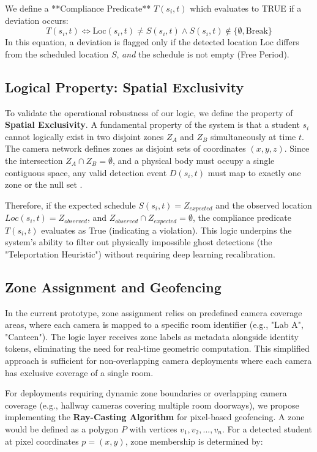 \documentclass[conference]{IEEEtran}
\begin{document}
We define a **Compliance Predicate** $T(s_i, t)$ which evaluates to TRUE if a deviation occurs:
\begin{equation}
T(s_i, t) \iff \text{Loc}(s_i, t) \neq S(s_i, t) \land S(s_i, t) \notin \{\emptyset, \text{Break}\}
\end{equation}
In this equation, a deviation is flagged only if the detected location $\text{Loc}$ differs from the scheduled location $S$, \textit{and} the schedule is not empty (Free Period).

\subsection{Logical Property: Spatial Exclusivity}
To validate the operational robustness of our logic, we define the property of \textbf{Spatial Exclusivity}. 
A fundamental property of the system is that a student $s_i$ cannot logically exist in two disjoint zones $Z_A$ and $Z_B$ simultaneously at time $t$. The camera network defines zones as disjoint sets of coordinates $(x,y,z)$. Since the intersection $Z_A \cap Z_B = \emptyset$, and a physical body must occupy a single contiguous space, any valid detection event $D(s_i, t)$ must map to exactly one zone or the null set \cite{b13}.

Therefore, if the expected schedule $S(s_i, t) = Z_{expected}$ and the observed location $Loc(s_i, t) = Z_{observed}$, and $Z_{observed} \cap Z_{expected} = \emptyset$, the compliance predicate $T(s_i, t)$ evaluates as True (indicating a violation). This logic underpins the system's ability to filter out physically impossible ghost detections (the "Teleportation Heuristic") without requiring deep learning recalibration.

\subsection{Zone Assignment and Geofencing}
In the current prototype, zone assignment relies on predefined camera coverage areas, where each camera is mapped to a specific room identifier (e.g., "Lab A", "Canteen"). The logic layer receives zone labels as metadata alongside identity tokens, eliminating the need for real-time geometric computation. This simplified approach is sufficient for non-overlapping camera deployments where each camera has exclusive coverage of a single room.

For deployments requiring dynamic zone boundaries or overlapping camera coverage (e.g., hallway cameras covering multiple room doorways), we propose implementing the \textbf{Ray-Casting Algorithm} for pixel-based geofencing. A zone would be defined as a polygon $P$ with vertices $v_1, v_2, ..., v_n$. For a detected student at pixel coordinates $p=(x,y)$, zone membership is determined by: 
\end{document}
